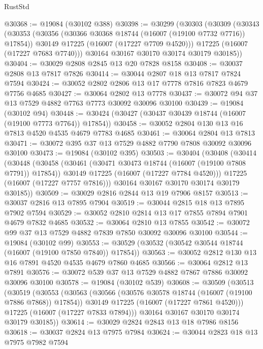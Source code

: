 \begin{lexlean}{RustStd}
\begin{coremodule}
@30368 := @19084 (@30102 @388)
@30398 := @30299
    (@30303
      (@30309
        (@30343
          (@30353
            (@30356 (@30366 @30368 @18744 (@16007 (@19100 @7732 @7716)) @17854))
            @30149
            @17225
            (@16007 (@17227 @7709 @4520)))
          @17225
          (@16007 (@17227 @7683 @7740)))
        @30164
        @30167
        @30170
        @30174
        @30179
        @30185))
@30404 := @30029 @2808 @2845 @13 @20 @7828 @8158
@30408 := @30037 @2808 @13 @7817 @7826
@30414 := @30044 @2807 @18 @13 @7817 @7824 @7594
@30424 := @30052 @2802 @2806 @13 @17 @7778 @7816 @7823 @4679 @7756 @4685
@30427 := @30064 @2802 @13 @7778
@30437 := @30072 @94 @37 @13 @7529 @4882 @7763 @7773 @30092 @30096 @30100
@30439 := @19084 (@30102 @94)
@30448 := @30424 (@30427 (@30437 @30439 @18744 (@16007 (@19100 @7773 @7764)) @17854))
@30458 := @30052 @2804 @130 @13 @16 @7813 @4520 @4535 @4679 @7783 @4685
@30461 := @30064 @2804 @13 @7813
@30471 := @30072 @395 @37 @13 @7529 @4882 @7790 @7808 @30092 @30096 @30100
@30473 := @19084 (@30102 @395)
@30503 := @30404
    (@30408
      (@30414
        (@30448
          (@30458
            (@30461 (@30471 @30473 @18744 (@16007 (@19100 @7808 @7791)) @17854))
            @30149
            @17225
            (@16007 (@17227 @7784 @4520)))
          @17225
          (@16007 (@17227 @7757 @7816)))
        @30164
        @30167
        @30170
        @30174
        @30179
        @30185))
@30509 := @30029 @2816 @2844 @13 @19 @7906 @8157
@30513 := @30037 @2816 @13 @7895 @7904
@30519 := @30044 @2815 @18 @13 @7895 @7902 @7594
@30529 := @30052 @2810 @2814 @13 @17 @7855 @7894 @7901 @4679 @7832 @4685
@30532 := @30064 @2810 @13 @7855
@30542 := @30072 @99 @37 @13 @7529 @4882 @7839 @7850 @30092 @30096 @30100
@30544 := @19084 (@30102 @99)
@30553 := @30529 (@30532 (@30542 @30544 @18744 (@16007 (@19100 @7850 @7840)) @17854))
@30563 := @30052 @2812 @130 @13 @16 @7891 @4520 @4535 @4679 @7860 @4685
@30566 := @30064 @2812 @13 @7891
@30576 := @30072 @539 @37 @13 @7529 @4882 @7867 @7886 @30092 @30096 @30100
@30578 := @19084 (@30102 @539)
@30608 := @30509
    (@30513
      (@30519
        (@30553
          (@30563
            (@30566 (@30576 @30578 @18744 (@16007 (@19100 @7886 @7868)) @17854))
            @30149
            @17225
            (@16007 (@17227 @7861 @4520)))
          @17225
          (@16007 (@17227 @7833 @7894)))
        @30164
        @30167
        @30170
        @30174
        @30179
        @30185))
@30614 := @30029 @2824 @2843 @13 @18 @7986 @8156
@30618 := @30037 @2824 @13 @7975 @7984
@30624 := @30044 @2823 @18 @13 @7975 @7982 @7594

\end{coremodule}
\end{lexlean}
